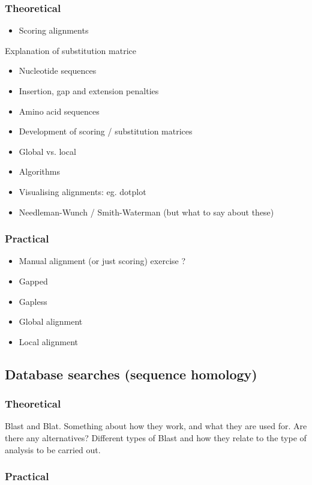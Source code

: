 \documentclass{scrartcl}
\begin{document}
\subsubsection{Theoretical}
\label{sec-4-1-1}

\begin{itemize}
\item Scoring alignments
\end{itemize}
Explanation of substitution matrice
\begin{itemize}
\item Nucleotide sequences
\item Insertion, gap and extension penalties
\item Amino acid sequences
\item Development of scoring / substitution matrices
\item Global vs. local
\item Algorithms
\item Visualising alignments: eg. dotplot
\item Needleman-Wunch / Smith-Waterman (but what to say about these)
\end{itemize}
\subsubsection{Practical}
\label{sec-4-1-2}

\begin{itemize}
\item Manual alignment (or just scoring) exercise ?
\item Gapped
\item Gapless
\item Global alignment
\item Local alignment
\end{itemize}
\subsection{Database searches (sequence homology)}
\label{sec-4-2}
\subsubsection{Theoretical}
\label{sec-4-2-1}

Blast and Blat. Something about how they work, and what they are used for. Are there
any alternatives?
Different types of Blast and how they relate to the type of analysis to be carried out.
\subsubsection{Practical}
\label{sec-4-2-2}
\end{document}

